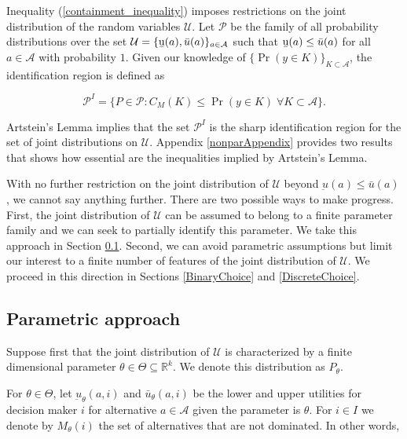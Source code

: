 \documentclass[reqno]{article}
\begin{document}
Inequality (\ref{containment_inequality}) imposes restrictions on the joint distribution of the random variables $\mathcal{U}$. Let $\mathcal{P}$ be the family of all probability distributions over the set $\mathcal{U}=\{\text{\b{u}}(a),\bar{u}(a)\}_{a\in \mathcal{A}}$ such that $\text{\b{u}}(a) \leq \bar{u}(a)$ for all $a\in \mathcal{A}$ with probability $1$. Given our knowledge of $\{\Pr(y\in K)\}_{K\subset \mathcal{A}}$, the identification region is defined as%

\begin{equation} \label{idRegion}
\mathcal{P}^{I}=\{P\in \mathcal{P} :C_{M}(K)\leq \Pr (y\in K) \; \forall K\subset \mathcal{A} \}\text{.}
\end{equation}

Artstein's Lemma implies that the set $\mathcal{P}^I$ is the sharp identification region for the set of joint distributions on $\mathcal{U}$. Appendix \ref{nonparAppendix} provides two results that shows how essential are the inequalities implied by Artstein's Lemma.

With no further restriction on the joint distribution of $\mathcal{U}$ beyond $\underbar{u}\left( a\right) \leq  \bar{u} \left( a\right)$, we cannot say anything further. There are two possible ways to make progress. First, the joint distribution of $\mathcal{U}$ can be assumed to belong to a finite parameter family and we can seek to partially identify this parameter. We take this approach in Section \ref{par}. Second, we can avoid parametric assumptions but limit our interest to a finite number of features of the joint distribution of $\mathcal{U}$. We proceed in this direction in Sections \ref{BinaryChoice} and \ref{DiscreteChoice}. 

\subsection{Parametric approach}\label{par}
Suppose first that the joint distribution of $\mathcal{U}$ is characterized by a finite dimensional parameter $\theta \in \Theta \subseteq  \mathbb{R}^k$. We denote this distribution as $P_{\theta}$. 

For $\theta \in \Theta$, let $\underbar{u}_{\theta}(a,i)$ and $\bar{u}_{\theta}(a,i)$ be the lower and upper utilities for decision maker $i$ for alternative $a \in \mathcal{A}$ given the parameter is $\theta$. For $i\in I$ we denote by $M_{\theta}(i)$ the set of alternatives that are not dominated. In other words, 
\end{document}
